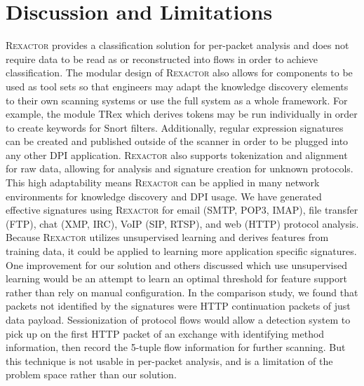 \section{Discussion and Limitations}

\textsc{Rexactor} provides a classification solution for per-packet analysis and does not require data to be read as or reconstructed into flows in order to achieve classification. The modular design of \textsc{Rexactor} also allows for components to be used as tool sets so that engineers may adapt the knowledge discovery elements to their own scanning systems or use the full system as a whole framework. For example, the module TRex which derives tokens may be run individually in order to create keywords for Snort filters. Additionally, regular expression signatures can be created and published outside of the scanner in order to be plugged into any other DPI application. \textsc{Rexactor} also supports tokenization and alignment for raw data, allowing for analysis and signature creation for unknown protocols. This high adaptability means \textsc{Rexactor} can be applied in many network environments for knowledge discovery and DPI usage.
We have generated effective signatures using \textsc{Rexactor} for email (SMTP, POP3, IMAP), file transfer (FTP), chat (XMP, IRC), VoIP (SIP, RTSP), and web (HTTP) protocol analysis. Because \textsc{Rexactor} utilizes unsupervised learning and derives features from training data, it could be applied to learning more application specific signatures. One improvement for our solution and others discussed which use unsupervised learning would be an attempt to learn an optimal threshold for feature support rather than rely on manual configuration. In the comparison study, we found that packets not identified by the signatures were HTTP continuation packets of just data payload. Sessionization of protocol flows would allow a detection system to pick up on the first HTTP packet of an exchange with identifying method information, then record the 5-tuple flow information for further scanning. But this technique is not usable in per-packet analysis, and is a limitation of the problem space rather than our solution.

